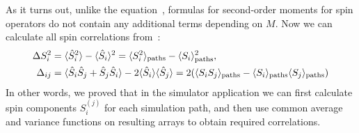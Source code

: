 As it turns out, unlike the equation~, formulas for second-order moments for spin operators do not contain any additional terms depending on $M$.
Now we can calculate all spin correlations from~\cite{Li2009}:
\begin{equation*}
\begin{split}
	\Delta S^2_i
		& = \langle \hat{S}^2_i \rangle - \langle \hat{S}_i \rangle^2
		= \langle  S^2_i  \rangle_{\mathrm{paths}} - \langle  S_i  \rangle_{\mathrm{paths}}^2, \\
	\Delta_{ij}
		& = \langle \hat{S}_i \hat{S}_j + \hat{S}_j \hat{S}_i \rangle
		- 2 \langle \hat{S}_i \rangle \langle \hat{S}_j \rangle
		= 2 ( \langle  S_i S_j  \rangle_{\mathrm{paths}} - \langle  S_i  \rangle_{\mathrm{paths}} \langle  S_j  \rangle_{\mathrm{paths}} )
\end{split}
\end{equation*}
In other words, we proved that in the simulator application we can first calculate spin components $S^{(j)}_i$ for each simulation path, and then use common average and variance functions on resulting arrays to obtain required correlations.

